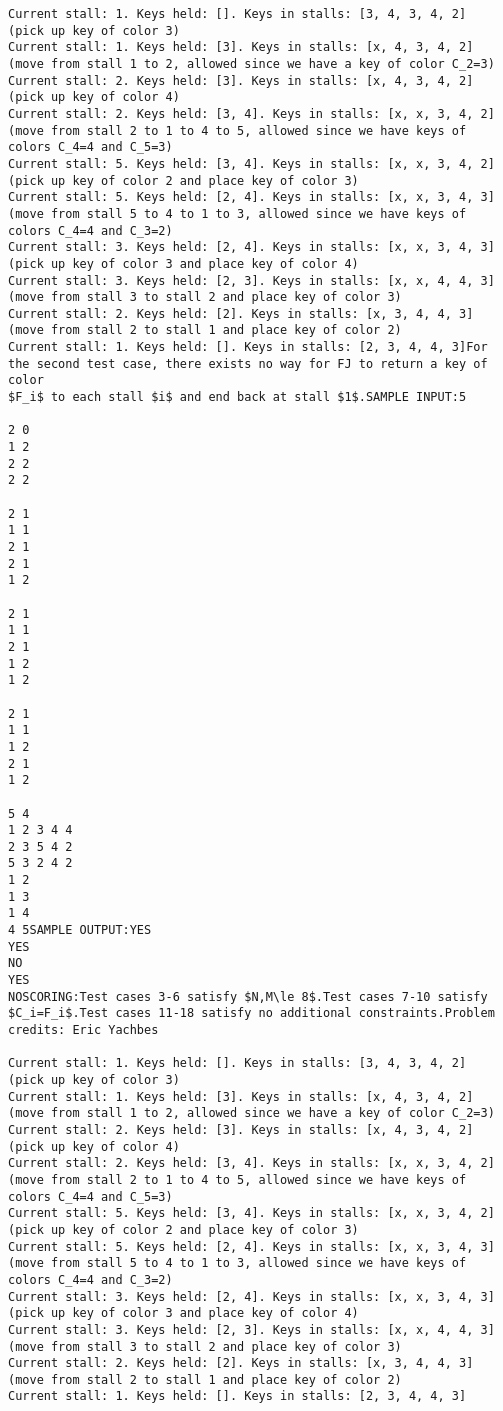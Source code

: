 \documentclass[12pt]{article}
\begin{document}
\begin{verbatim}
Current stall: 1. Keys held: []. Keys in stalls: [3, 4, 3, 4, 2]
(pick up key of color 3)
Current stall: 1. Keys held: [3]. Keys in stalls: [x, 4, 3, 4, 2]
(move from stall 1 to 2, allowed since we have a key of color C_2=3)
Current stall: 2. Keys held: [3]. Keys in stalls: [x, 4, 3, 4, 2]
(pick up key of color 4)
Current stall: 2. Keys held: [3, 4]. Keys in stalls: [x, x, 3, 4, 2]
(move from stall 2 to 1 to 4 to 5, allowed since we have keys of colors C_4=4 and C_5=3)
Current stall: 5. Keys held: [3, 4]. Keys in stalls: [x, x, 3, 4, 2]
(pick up key of color 2 and place key of color 3)
Current stall: 5. Keys held: [2, 4]. Keys in stalls: [x, x, 3, 4, 3]
(move from stall 5 to 4 to 1 to 3, allowed since we have keys of colors C_4=4 and C_3=2)
Current stall: 3. Keys held: [2, 4]. Keys in stalls: [x, x, 3, 4, 3]
(pick up key of color 3 and place key of color 4)
Current stall: 3. Keys held: [2, 3]. Keys in stalls: [x, x, 4, 4, 3]
(move from stall 3 to stall 2 and place key of color 3)
Current stall: 2. Keys held: [2]. Keys in stalls: [x, 3, 4, 4, 3]
(move from stall 2 to stall 1 and place key of color 2)
Current stall: 1. Keys held: []. Keys in stalls: [2, 3, 4, 4, 3]For the second test case, there exists no way for FJ to return a key of color
$F_i$ to each stall $i$ and end back at stall $1$.SAMPLE INPUT:5

2 0
1 2
2 2
2 2

2 1
1 1
2 1
2 1
1 2

2 1
1 1
2 1
1 2
1 2

2 1
1 1
1 2
2 1
1 2

5 4
1 2 3 4 4
2 3 5 4 2
5 3 2 4 2
1 2
1 3
1 4
4 5SAMPLE OUTPUT:YES
YES
NO
YES
NOSCORING:Test cases 3-6 satisfy $N,M\le 8$.Test cases 7-10 satisfy $C_i=F_i$.Test cases 11-18 satisfy no additional constraints.Problem credits: Eric Yachbes

Current stall: 1. Keys held: []. Keys in stalls: [3, 4, 3, 4, 2]
(pick up key of color 3)
Current stall: 1. Keys held: [3]. Keys in stalls: [x, 4, 3, 4, 2]
(move from stall 1 to 2, allowed since we have a key of color C_2=3)
Current stall: 2. Keys held: [3]. Keys in stalls: [x, 4, 3, 4, 2]
(pick up key of color 4)
Current stall: 2. Keys held: [3, 4]. Keys in stalls: [x, x, 3, 4, 2]
(move from stall 2 to 1 to 4 to 5, allowed since we have keys of colors C_4=4 and C_5=3)
Current stall: 5. Keys held: [3, 4]. Keys in stalls: [x, x, 3, 4, 2]
(pick up key of color 2 and place key of color 3)
Current stall: 5. Keys held: [2, 4]. Keys in stalls: [x, x, 3, 4, 3]
(move from stall 5 to 4 to 1 to 3, allowed since we have keys of colors C_4=4 and C_3=2)
Current stall: 3. Keys held: [2, 4]. Keys in stalls: [x, x, 3, 4, 3]
(pick up key of color 3 and place key of color 4)
Current stall: 3. Keys held: [2, 3]. Keys in stalls: [x, x, 4, 4, 3]
(move from stall 3 to stall 2 and place key of color 3)
Current stall: 2. Keys held: [2]. Keys in stalls: [x, 3, 4, 4, 3]
(move from stall 2 to stall 1 and place key of color 2)
Current stall: 1. Keys held: []. Keys in stalls: [2, 3, 4, 4, 3]


\end{verbatim}
\end{document}
